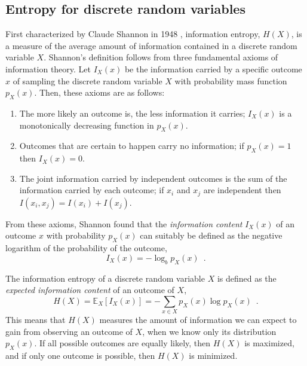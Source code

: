 \subsection{Entropy for discrete random variables}

First characterized by Claude Shannon in 1948 \cite{shannon_mathematical_1948}, information entropy, $H(X)$, is a measure of the average amount of information contained in a discrete random variable $X$. Shannon's definition follows from three fundamental axioms of information theory. Let $I_X(x)$ be the information carried by a specific outcome $x$ of sampling the discrete random variable $X$ with probability mass function $p_X(x)$. Then, these axioms are as follows:
\begin{enumerate}[label=(\Roman*)]
    \item The more likely an outcome is, the less information it carries; $I_X(x)$ is a monotonically decreasing function in $p_X(x)$.
    \item Outcomes that are certain to happen carry no information; if $p_X(x) = 1$ then $I_X(x) = 0$.
    \item The joint information carried by independent outcomes is the sum of the information carried by each outcome; if $x_i$ and $x_j$ are independent then $I(x_i, x_j) = I(x_i) + I(x_j)$. 
\end{enumerate}

From these axioms, Shannon found that the \emph{information content} $I_X(x)$ of an outcome $x$ with probability $p_X(x)$ can suitably be defined as the negative logarithm of the probability of the outcome,
%
\begin{equation} \label{eq:information-content}
    I_X(x) = -\log_b p_X(x) \enspace .
\end{equation}
%

The information entropy of a discrete random variable $X$ is defined as the \emph{expected information content} of an outcome of $X$,
%
\begin{equation} \label{eq:information-entropy}
    H(X) = \mathbb{E}_X\left[I_X(x)\right] = - \sum_{x\in X} p_X(x) \log p_X(x) \enspace .
\end{equation}
%
This means that $H(X)$ measures the amount of information we can expect to gain from observing an outcome of $X$, when we know only its distribution $p_X(x)$. If all possible outcomes are equally likely, then $H(X)$ is maximized, and if only one outcome is possible, then $H(X)$ is minimized.




